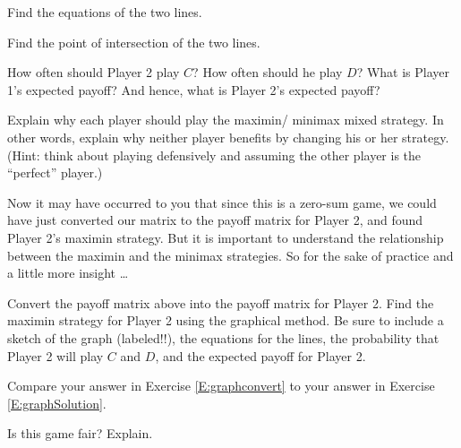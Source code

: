 \begin{xca}\label{E:graphFindEquations}
Find the equations of the two lines.
\end{xca}

\begin{xca}\label{E:graphFindIntersection}
Find the point of intersection of the two lines.
\end{xca}

\begin{xca}\label{E:graphSolution}
How often should Player 2 play $C$? How often should he play $D$? What is Player 1's expected payoff? And hence, what is Player 2's expected payoff? 
\end{xca}


\begin{xca}\label{E:whyequil}
Explain why each player should play the maximin/ minimax mixed strategy. In other words, explain why neither player benefits by changing his or her strategy. (Hint: think about playing defensively and assuming the other player is the ``perfect'' player.)
\end{xca}


Now it may have occurred to you that since this is a zero-sum game, we could have just converted our matrix to the payoff matrix for Player 2, and found Player 2's maximin strategy. But it is important to understand the relationship between the maximin and the minimax strategies. So for the sake of practice and a little more insight \ldots


\begin{xca}\label{E:graphconvert}
Convert the payoff matrix above into the payoff matrix for Player 2. Find the maximin strategy for Player 2 using the graphical method. Be sure to include a sketch of the graph (labeled!!), the equations for the lines, the probability that Player 2 will play $C$ and $D$, and the expected payoff for Player 2.
\end{xca}

\begin{xca}\label{E:graphcompareapproaches}
Compare your answer in Exercise \ref{E:graphconvert} to your answer in Exercise \ref{E:graphSolution}. 
\end{xca}

\begin{xca}\label{graphfair}
Is this game fair? Explain.
\end{xca}

